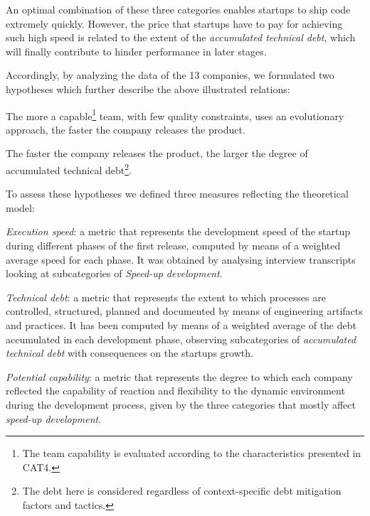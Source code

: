 \documentclass[10pt,journal,letterpaper,compsoc]{IEEEtran}
\begin{document}
An optimal combination of these three categories enables startups to ship code
extremely quickly. However, the price that startups have to pay for achieving
such high speed is related to the extent of the \textit{accumulated technical
debt}, which will finally contribute to hinder performance in later stages.


Accordingly, by analyzing the data of the 13 companies, we formulated two
hypotheses which further describe the above illustrated relations: 

\begin{compactenum} 
\item The more a capable\footnote{The team capability is
evaluated according to the characteristics presented in CAT4.} team, with few
quality constraints, uses an evolutionary approach, the faster the company
releases the product. 
\item The faster the company releases the product, the larger the degree of 
accumulated technical debt\footnote{The debt here is considered 
regardless of context-specific debt mitigation factors and tactics.}. 
\end{compactenum}

To assess these hypotheses we defined three measures reflecting the theoretical
model:

\begin{compactitem}
\item \textit{Execution speed}: a metric that represents the development speed
of the startup during different phases of the first release, computed by means
of a weighted average speed for each phase. It was obtained by analysing
interview transcripts looking at subcategories of \textit{Speed-up development}.

\item \textit{Technical debt}: a metric that represents the extent to which
processes are controlled, structured, planned and documented by means of
engineering artifacts and practices. It has been computed by means of a weighted
average of the debt accumulated in each development phase, observing
subcategories of \textit{accumulated technical debt} with consequences on the
startups growth.

\item \textit{Potential capability}: a metric that represents the degree to
which each company reflected the capability of reaction and flexibility to the
dynamic environment during the development process, given by the three
categories that mostly affect \textit{speed-up development}. 
\end{compactitem}
\end{document}

